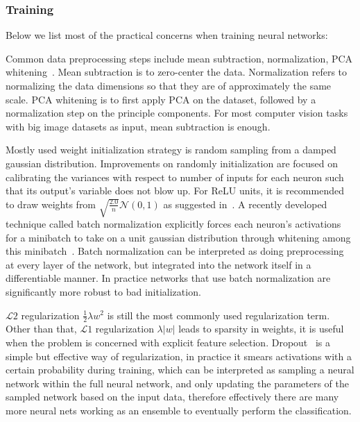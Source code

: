 \subsubsection{Training}
Below we list most of the practical concerns when training neural networks:
\begin{description}[labelindent=1cm]
  \item[Data Preprocessing] Common data preprocessing steps include mean subtraction, normalization, PCA whitening~\cite{links:ufldlpca}. Mean subtraction is to zero-center the data. Normalization refers to normalizing the data dimensions so that they are of approximately the same scale. PCA whitening is to first apply PCA on the dataset, followed by a normalization step on the principle components. For most computer vision tasks with big image datasets as input, mean subtraction is enough.
  \item[Weight Initialization] Mostly used weight initialization strategy is random sampling from a damped gaussian distribution. Improvements on randomly initialization are focused on calibrating the variances with respect to number of inputs for each neuron such that its output's variable does not blow up. For ReLU units, it is recommended to draw weights from $\sqrt{\frac{2.0}{n}}\mathcal{N}(0,1)$ as suggested in~\cite{he2015delving}. A recently developed technique called batch normalization explicitly forces each neuron's activations for a minibatch to take on a unit gaussian distribution through whitening among this minibatch~\cite{ioffe2015batch}. Batch normalization can be interpreted as doing preprocessing at every layer of the network, but integrated into the network itself in a differentiable manner. In practice networks that use batch normalization are significantly more robust to bad initialization.
  \item[Regularization] $\mathcal{L}2$ regularization $\frac{1}{2}\lambda w^2$ is still the most commonly used regularization term. Other than that, $\mathcal{L}1$ regularization $\lambda |w|$ leads to sparsity in weights, it is useful when the problem is concerned with explicit feature selection. Dropout~\cite{srivastava2014dropout} is a simple but effective way of regularization, in practice it smears activations with a certain probability during training, which can be interpreted as sampling a neural network within the full neural network, and only updating the parameters of the sampled network based on the input data, therefore effectively there are many more neural nets working as an ensemble to eventually perform the classification.

\end{description}
